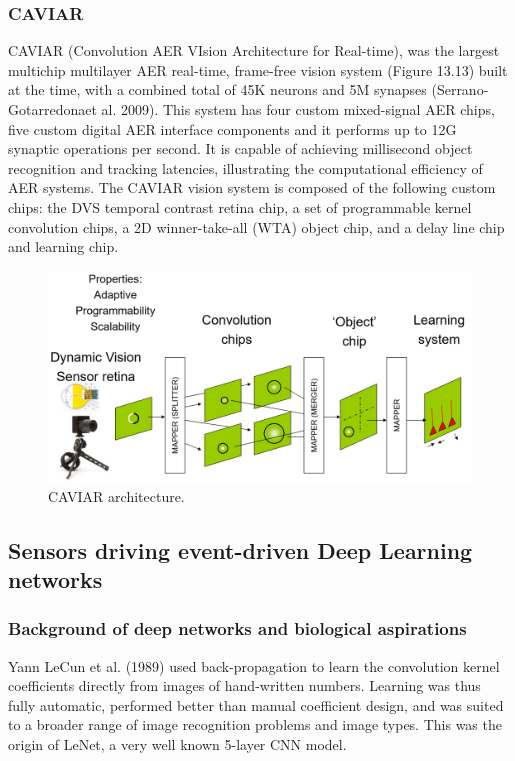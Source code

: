 \documentclass[main]{subfiles}
\begin{document}
\subsubsection{CAVIAR}
CAVIAR (Convolution AER VIsion Architecture for Real-time), was the largest multichip multilayer AER real-time, frame-free vision system (Figure 13.13) built at the time, with a combined total of 45K neurons and 5M synapses (Serrano-Gotarredonaet al. 2009). This system has four custom mixed-signal AER chips, five custom digital AER interface components and it performs up to 12G synaptic operations per second. It is capable of achieving millisecond object recognition and tracking latencies, illustrating the computational efficiency of AER systems. The CAVIAR vision system is composed of the following custom chips: the DVS temporal contrast retina chip, a set of programmable kernel convolution chips, a 2D winner-take-all (WTA) object chip, and a delay line chip and learning chip.

%
\begin{figure}[h]
    \centering
    \includegraphics[width=0.8\linewidth]{11_NeuromorphicSystems1/figures/caviar.png}
    \caption{CAVIAR architecture.}
    \label{fig:dvs}
\end{figure}
%

\subsection{Sensors driving event-driven Deep Learning networks}
\subsubsection{Background of deep networks and biological aspirations}
Yann LeCun et al. (1989) used back-propagation to learn the convolution kernel coefficients directly from images of hand-written numbers. Learning was thus fully automatic, performed better than manual coefficient design, and was suited to a broader range of image recognition problems and image types. This was the origin of LeNet, a very well known 5-layer CNN model.
\end{document}
